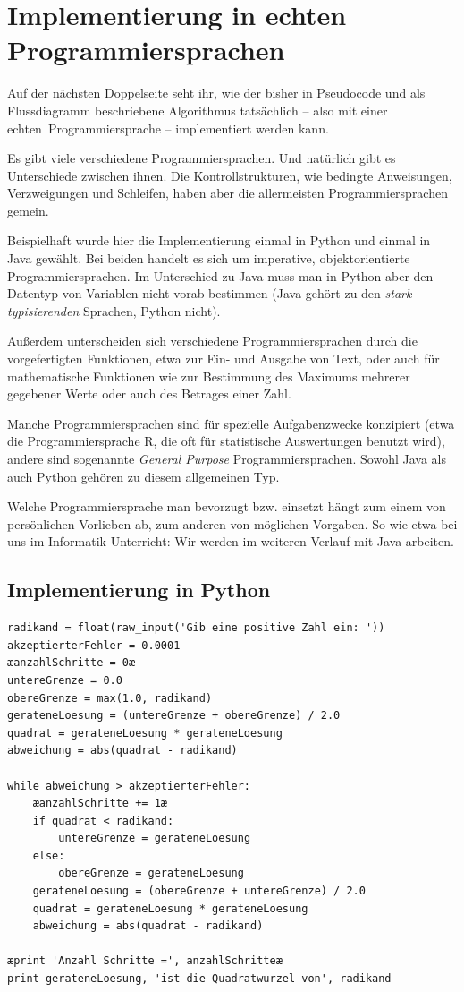 \clearpage

\section{Implementierung in echten Programmiersprachen}

Auf der nächsten Doppelseite seht ihr, wie der bisher in Pseudocode und als
Flussdiagramm  beschriebene Algorithmus tatsächlich -- also mit einer \glqq
echten\grqq\ Programmiersprache -- implementiert werden kann.

Es gibt viele verschiedene Programmiersprachen. Und natürlich gibt es
Unterschiede zwischen ihnen. Die Kontrollstrukturen, wie bedingte Anweisungen,
Verzweigungen und Schleifen, haben aber die allermeisten Programmiersprachen
gemein.

Beispielhaft wurde hier die Implementierung einmal in Python und einmal in Java
gewählt. Bei beiden handelt es sich um imperative, objektorientierte
Programmiersprachen. Im Unterschied zu Java muss man in Python aber den Datentyp
von Variablen nicht vorab bestimmen (Java gehört zu den \emph{stark
typisierenden} Sprachen, Python nicht).

Außerdem unterscheiden sich verschiedene Programmiersprachen durch die
vorgefertigten Funktionen, etwa zur Ein- und Ausgabe von Text, oder auch für
mathematische Funktionen wie zur Bestimmung des Maximums mehrerer
gegebener Werte oder auch des Betrages einer Zahl.

Manche Programmiersprachen sind für spezielle Aufgabenzwecke konzipiert (etwa
die Programmiersprache R, die oft für statistische Auswertungen benutzt wird),
andere sind sogenannte \emph{General Purpose} Programmiersprachen. Sowohl Java
als auch Python gehören zu diesem allgemeinen Typ.

Welche Programmiersprache man bevorzugt bzw. einsetzt hängt zum einem von
persönlichen Vorlieben ab, zum anderen von möglichen Vorgaben. So wie etwa bei
uns im Informatik-Unterricht: Wir werden im weiteren Verlauf mit Java arbeiten. 

\clearpage

\subsection{Implementierung in Python}

\begin{lstlisting}
radikand = float(raw_input('Gib eine positive Zahl ein: '))
akzeptierterFehler = 0.0001
æanzahlSchritte = 0æ
untereGrenze = 0.0
obereGrenze = max(1.0, radikand)
gerateneLoesung = (untereGrenze + obereGrenze) / 2.0
quadrat = gerateneLoesung * gerateneLoesung
abweichung = abs(quadrat - radikand)

while abweichung > akzeptierterFehler:
    æanzahlSchritte += 1æ
    if quadrat < radikand:
        untereGrenze = gerateneLoesung
    else:
        obereGrenze = gerateneLoesung
    gerateneLoesung = (obereGrenze + untereGrenze) / 2.0
    quadrat = gerateneLoesung * gerateneLoesung
    abweichung = abs(quadrat - radikand)

æprint 'Anzahl Schritte =', anzahlSchritteæ
print gerateneLoesung, 'ist die Quadratwurzel von', radikand
\end{lstlisting}

